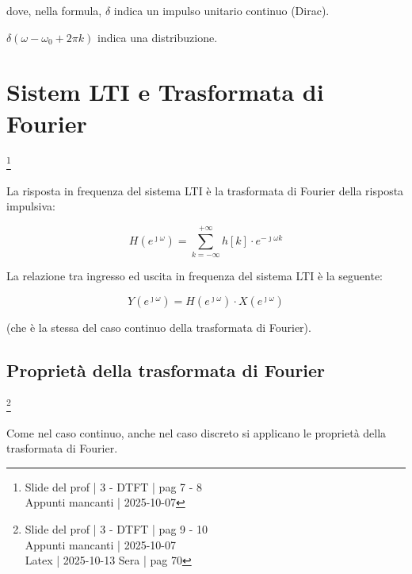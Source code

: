 dove, nella formula, $\delta$ indica un impulso unitario continuo (Dirac). \newline 

\begin{tcolorbox}
$\delta \left( \omega - \omega_0 + 2 \pi k\right) $ indica una distribuzione. 
\end{tcolorbox}
 
\newpage 

\section{Sistem LTI e Trasformata di Fourier}

\footnote{ 
    Slide del prof | 3 - DTFT | pag 7 - 8\\
    Appunti mancanti | 2025-10-07 
} 

La risposta in frequenza del sistema LTI è la trasformata di Fourier della risposta impulsiva: 

{
    \Large 
    \begin{equation}
        H\left( e^{\jmath \omega}\right)
        = 
        \sum_{k = - \infty}^{+ \infty}
        h \left[ k\right]
        \cdot 
        e^{-\jmath \omega k}    
    \end{equation}
} 

La relazione tra ingresso ed uscita in frequenza del sistema LTI è la seguente: 

{
    \Large 
    \begin{equation}
        Y \left( e^{\jmath \omega}\right) 
        = 
        H \left( e^{\jmath \omega}\right) 
        \cdot 
        X \left( e^{\jmath \omega}\right) 
    \end{equation}
}

(che è la stessa del caso continuo della trasformata di Fourier). \newline 

\newpage 

\subsection{Proprietà della trasformata di Fourier} \label{subsubsec: Proprietà della trasformata di Fourier}

\footnote{ 
    Slide del prof | 3 - DTFT | pag 9 - 10\\
    Appunti mancanti | 2025-10-07 \\ 
    Latex | 2025-10-13 Sera | pag 70
} 

Come nel caso continuo, anche nel caso discreto si applicano le proprietà della trasformata di Fourier. \newline 

